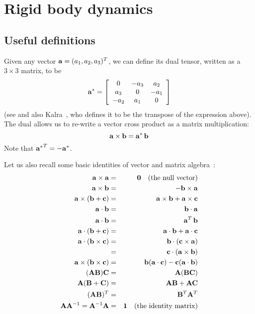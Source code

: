 \section{Rigid body dynamics\label{rigidBodyAppendix}}
\subsection{Useful definitions}

Given any vector $\ve{a} = (a_1, a_2, a_3)^T$, we can define its dual
tensor, written as a $3\times3$ matrix, to be
\begin{equation}
\dual{\ve{a}} = \left[\begin{array}{ccc}
    0 & -a_3 & a_2 \\ a_3 & 0 & -a_1 \\ -a_2 & a_1 & 0
    \end{array}\right]
\end{equation}
(see \cite{RHB:02,BaraffWitkin:97} and also Kalra~\cite{Kalra:95}, who defines it to be
the transpose of the expression above).
The dual allows us to re-write a vector cross product as a matrix multiplication:
\begin{equation}
\ve{a}\times\ve{b} = \dual{\ve{a}}\,\ve{b}
\end{equation}
Note that $\dual{\ve{a}}^T = -\dual{\ve{a}}$.

Let us also recall some basic identities of vector and matrix algebra~\cite{RHB:02}:
\begin{eqnarray*}
\ve{a}\times\ve{a} & = & \ve{0}\quad\mathrm{(the~null~vector)} \\
\ve{a}\times\ve{b} & = & -\ve{b}\times\ve{a} \\
\ve{a}\times(\ve{b} + \ve{c}) & = & \ve{a}\times\ve{b} + \ve{a}\times\ve{c} \\
\ve{a}\cdot\ve{b} & = & \ve{b}\cdot\ve{a} \\
\ve{a}\cdot\ve{b} & = & \ve{a}^T\,\ve{b} \\
\ve{a}\cdot(\ve{b} + \ve{c}) & = & \ve{a}\cdot\ve{b} + \ve{a}\cdot\ve{c} \\
\ve{a}\cdot(\ve{b}\times\ve{c}) & = & \ve{b}\cdot(\ve{c}\times\ve{a}) \\
    & = & \ve{c}\cdot(\ve{a}\times\ve{b}) \\
\ve{a}\times(\ve{b}\times\ve{c}) & = &
    \ve{b}(\ve{a}\cdot\ve{c}) - \ve{c}(\ve{a}\cdot\ve{b}) \\
(\m{A}\m{B})\m{C} & = & \m{A}(\m{B}\m{C}) \\
\m{A}(\m{B} + \m{C}) & = & \m{A}\m{B} + \m{A}\m{C} \\
(\m{A}\m{B})^T & = & \m{B}^T\m{A}^T \\
\m{A}\m{A}^{-1} = \m{A}^{-1}\m{A} & = & \m{1}\quad\mathrm{(the~identity~matrix)}
\end{eqnarray*}


